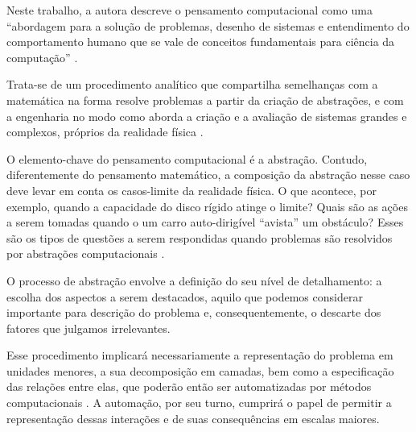 Neste trabalho, a autora descreve o pensamento computacional como uma ``abordagem para a solução de problemas, desenho de sistemas e entendimento do comportamento humano que se vale de conceitos fundamentais para ciência da computação'' \cite[tradução nossa]{wing2006}.

Trata-se de um procedimento analítico que compartilha semelhanças com a matemática na forma resolve problemas a partir da criação de abstrações, e com a engenharia no modo como aborda a criação e a avaliação de sistemas grandes e complexos, próprios da realidade física \cite[p.~3717]{wing2008}.

O elemento-chave do pensamento computacional é a abstração. Contudo, diferentemente do pensamento matemático, a composição da abstração nesse caso deve levar em conta os casos-limite da realidade física. O que acontece, por exemplo, quando a capacidade do disco rígido atinge o limite? Quais são as ações a serem tomadas quando o um carro auto-dirigível ``avista'' um obstáculo? Esses são os tipos de questões a serem respondidas quando problemas são resolvidos por abstrações computacionais \cite[p.~3718]{wing2008}.


O processo de abstração envolve a definição do seu nível de detalhamento: a escolha dos aspectos a serem destacados, aquilo que podemos considerar importante para descrição do problema e, consequentemente, o descarte dos fatores que julgamos irrelevantes. 

Esse procedimento implicará necessariamente a representação do problema em unidades menores, a sua decomposição em camadas, bem como a especificação das relações entre elas, que poderão então ser automatizadas por métodos computacionais \cite[p.~3718]{wing2008}. A automação, por seu turno, cumprirá o papel de permitir a representação dessas interações e de suas consequências em escalas maiores. %





